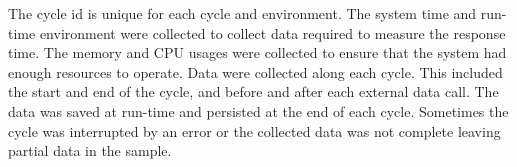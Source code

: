 The cycle id is unique for each cycle and environment.
The system time and run-time environment were collected to collect data required to measure the response time.
The memory and CPU usages were collected to ensure that the system had enough resources to operate.
Data were collected along each cycle.
This included the start and end of the cycle, and before and after each external data call.
The data was saved at run-time and persisted at the end of each cycle.
Sometimes the cycle was interrupted by an error or the collected data was not complete leaving partial data in the sample.

